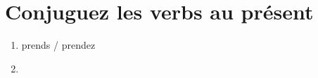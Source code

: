 \section{Conjuguez les verbs au présent}

\begin{enumerate}
    \item prends / prendez
    \item 
\end{enumerate}
